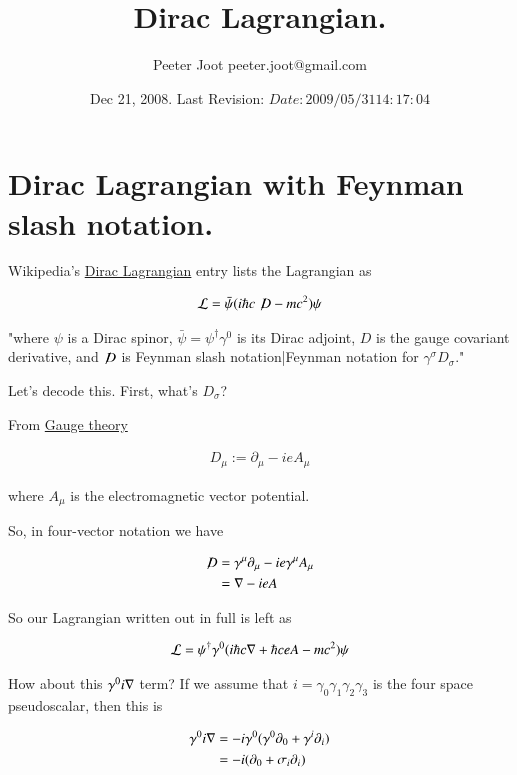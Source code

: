 \documentclass{article}
\title{ Dirac Lagrangian. }
\author{Peeter Joot \quad peeter.joot@gmail.com}
\date{ Dec 21, 2008.  Last Revision: $Date: 2009/05/31 14:17:04 $ }
\newcommand{\Dslash}[0]{ \not\!D }
\begin{document}
\maketitle{}
\tableofcontents

\section{ Dirac Lagrangian with Feynman slash notation. }

Wikipedia's \href{http://en.wikipedia.org/wiki/Lagrangian#Dirac_Lagrangian}{Dirac Lagrangian} entry lists the Lagrangian as

\begin{align*}
\LL = \bar \psi (i \hbar c \Dslash - mc^2) \psi
\end{align*}

"where $\psi\!$ is a Dirac spinor, $\bar \psi = \psi^\dagger \gamma^0$ is its Dirac adjoint, $D\!$ is the gauge covariant derivative, and $\Dslash$ is Feynman slash notation|Feynman notation for $\gamma^\sigma D_\sigma\!$."

Let's decode this.  First, what's $D_\sigma$?

From \href{http://en.wikipedia.org/wiki/Gauge_covariant_derivative}{Gauge theory}

\begin{align*}
D_\mu := \partial_\mu - i e A_\mu
\end{align*}

where $A_\mu$ is the electromagnetic vector potential.

So, in four-vector notation we have

\begin{align*}
\Dslash 
&= \gamma^\mu \partial_\mu - i e \gamma^\mu A_\mu \\
&= \grad - i e A \\
\end{align*}

So our Lagrangian written out in full is left as

\begin{align}\label{eqn:lag1}
\mathcal{L} = \psi^\dagger \gamma^0 ( i \hbar c \nabla + \hbar c e A - mc^2) \psi
\end{align}

How about this $\gamma^0 i \nabla$ term?  If we assume that $i = \gamma_0 \gamma_1 \gamma_2 \gamma_3$ is the four space pseudoscalar, then this is

\begin{align*}
\gamma^0 i \nabla
&= - i \gamma^0 (\gamma^0 \partial_0 + \gamma^i \partial_i) \\
&= - i (\partial_0 + \sigma_i \partial_i) \\
\end{align*}
\end{document}
